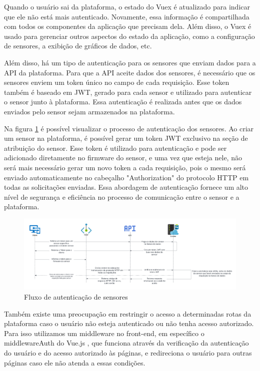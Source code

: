\documentclass[tcc,capa]{texufpel}
\begin{document}
Quando o usuário sai da plataforma, o estado do Vuex é atualizado para indicar que ele não está mais autenticado. Novamente, essa informação é compartilhada com todos os componentes da aplicação que precisam dela. Além disso, o Vuex é usado para gerenciar outros aspectos do estado da aplicação, como a configuração de sensores, a exibição de gráficos de dados, etc.

Além disso, há um tipo de autenticação para os sensores que enviam dados para a API da plataforma. Para que a API aceite dados dos sensores, é necessário que os sensores enviem um token único no campo de cada requisição. Esse token também é baseado em JWT, gerado para cada sensor e utilizado para autenticar o sensor junto à plataforma. Essa autenticação é realizada antes que os dados enviados pelo sensor sejam armazenados na plataforma.

Na figura \ref{jwtapi} é possível visualizar o processo de autenticação dos sensores. Ao criar um sensor na plataforma, é possível gerar um token JWT exclusivo na seção de atribuição do sensor. Esse token é utilizado para autenticação e pode ser adicionado diretamente no firmware do sensor, e uma vez que esteja nele, não será mais necessário gerar um novo token a cada requisição, pois o mesmo será enviado automaticamente no cabeçalho "Authorization" \space do protocolo HTTP em todas as solicitações enviadas. Essa abordagem de autenticação fornece um alto nível de segurança e eficiência no processo de comunicação entre o sensor e a plataforma.
\begin{figure}[htbp]
  \centering \includegraphics[scale=.4]{assets/jwtauthapi.png}
  \caption{Fluxo de autenticação de sensores}
  \label{jwtapi}
\end{figure}

Também existe uma preocupação em restringir o acesso a determinadas rotas da plataforma caso o usuário não esteja autenticado ou não tenha acesso autorizado. Para isso utilizamos um middleware no front-end, em específico o middlewareAuth do Vue.js \cite{vue:2014}, que funciona através da verificação da autenticação do usuário e do acesso autorizado às páginas, e redireciona o usuário para outras páginas caso ele não atenda a essas condições. 
\end{document}
